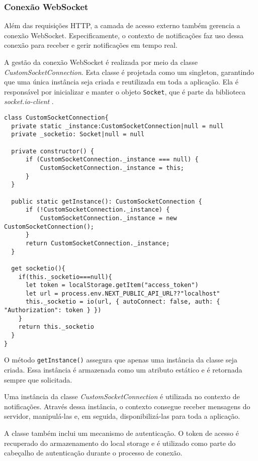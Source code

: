 \subsubsection{Conexão WebSocket}\label{subsec:websocketConncetion}
Além das requisições \gls{HTTP}, a camada de acesso externo também gerencia a conexão WebSocket. Especificamente, o contexto de notificações faz uso dessa conexão para receber e gerir notificações em tempo real.

A gestão da conexão WebSocket é realizada por meio da classe \textit{CustomSocketConnection}. Esta classe é projetada como um singleton, garantindo que uma única instância seja criada e reutilizada em toda a aplicação. Ela é responsável por inicializar e manter o objeto \texttt{Socket}, que é parte da biblioteca \textit{socket.io-client} \cite{socketIoClientApi}.

\begin{verbatim}
class CustomSocketConnection{
  private static _instance:CustomSocketConnection|null = null
  private _socketio: Socket|null = null

  private constructor() {
      if (CustomSocketConnection._instance === null) {
          CustomSocketConnection._instance = this;
      }
  }

  public static getInstance(): CustomSocketConnection {
      if (!CustomSocketConnection._instance) {
          CustomSocketConnection._instance = new CustomSocketConnection();
      }
      return CustomSocketConnection._instance;
  }

  get socketio(){
    if(this._socketio===null){
      let token = localStorage.getItem("access_token")
      let url = process.env.NEXT_PUBLIC_API_URL??"localhost"
      this._socketio = io(url, { autoConnect: false, auth: { "Authorization": token } })
    }
    return this._socketio
  }
}
\end{verbatim}

O método \texttt{getInstance()} assegura que apenas uma instância da classe seja criada. Essa instância é armazenada como um atributo estático e é retornada sempre que solicitada. 

Uma instância da classe \textit{CustomSocketConnection} é utilizada no contexto de notificações. Através dessa instância, o contexto consegue receber mensagens do servidor, manipulá-las e, em seguida, disponibilizá-las para toda a aplicação. 

A classe também inclui um mecanismo de autenticação. O token de acesso é recuperado do armazenamento do local storage e é utilizado como parte do cabeçalho de autenticação durante o processo de conexão.


